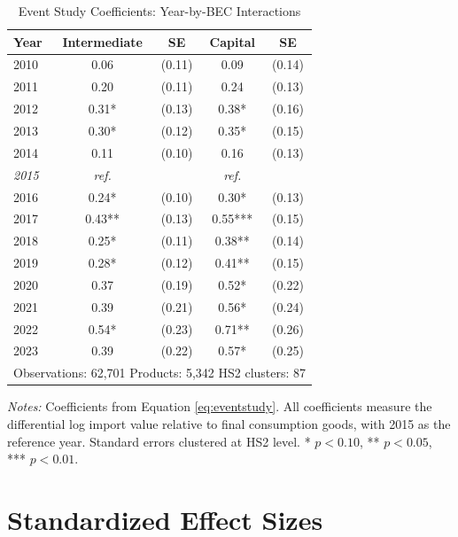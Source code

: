 \documentclass[12pt]{article}
\begin{document}
\begin{table}[H]
\centering
\caption{Event Study Coefficients: Year-by-BEC Interactions}
\label{tab:event_study_coefs}
\begin{threeparttable}
\begin{tabular}{lcccc}
\toprule
Year & Intermediate & SE & Capital & SE \\
\midrule
2010 & 0.06 & (0.11) & 0.09 & (0.14) \\
2011 & 0.20 & (0.11) & 0.24 & (0.13) \\
2012 & 0.31* & (0.13) & 0.38* & (0.16) \\
2013 & 0.30* & (0.12) & 0.35* & (0.15) \\
2014 & 0.11 & (0.10) & 0.16 & (0.13) \\
\textit{2015} & \textit{ref.} & & \textit{ref.} & \\
2016 & 0.24* & (0.10) & 0.30* & (0.13) \\
2017 & 0.43** & (0.13) & 0.55*** & (0.15) \\
2018 & 0.25* & (0.11) & 0.38** & (0.14) \\
2019 & 0.28* & (0.12) & 0.41** & (0.15) \\
2020 & 0.37 & (0.19) & 0.52* & (0.22) \\
2021 & 0.39 & (0.21) & 0.56* & (0.24) \\
2022 & 0.54* & (0.23) & 0.71** & (0.26) \\
2023 & 0.39 & (0.22) & 0.57* & (0.25) \\
\midrule
\multicolumn{5}{l}{Observations: 62,701 \quad Products: 5,342 \quad HS2 clusters: 87} \\
\bottomrule
\end{tabular}
\begin{tablenotes}[flushleft]
\small
\item \textit{Notes:} Coefficients from Equation \eqref{eq:eventstudy}. All coefficients measure the differential log import value relative to final consumption goods, with 2015 as the reference year. Standard errors clustered at HS2 level. * $p<0.10$, ** $p<0.05$, *** $p<0.01$.
\end{tablenotes}
\end{threeparttable}
\end{table}


\section{Standardized Effect Sizes}
\label{sec:sde}
\end{document}
